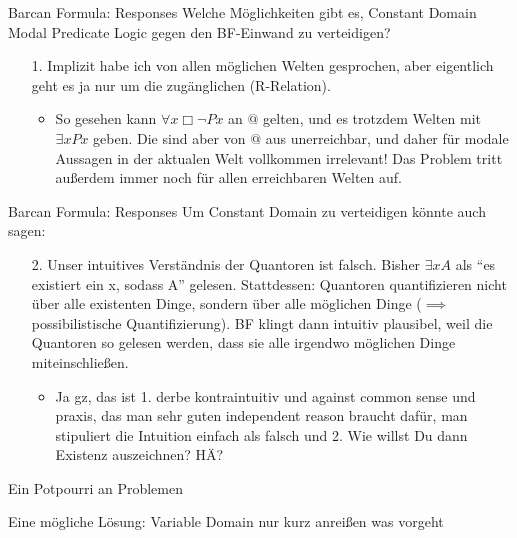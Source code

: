 \documentclass[12pt]{beamer}
\begin{document}
\begin{frame}{Barcan Formula: Responses}
  Welche Möglichkeiten gibt es, Constant Domain Modal Predicate Logic
  gegen den BF-Einwand zu verteidigen?
  \begin{enumerate}[<+->]
  \item[1.] Implizit habe ich von allen möglichen Welten gesprochen,
    aber eigentlich geht es ja nur um die zugänglichen (R-Relation).
    \begin{itemize}[<+->]
    \item So gesehen kann $\forall x \Box \neg Px$ an $@$ gelten, und
      es trotzdem Welten mit $\exists x Px$ geben. Die sind aber von
      $@$ aus unerreichbar, und daher für modale Aussagen in der
      aktualen Welt vollkommen irrelevant! Das Problem tritt außerdem
      immer noch für allen erreichbaren Welten auf.
    \end{itemize}
  \end{enumerate}
\end{frame}
\begin{frame}{Barcan Formula: Responses}
  Um Constant Domain zu verteidigen könnte auch sagen:
  \begin{enumerate}[<+->]
  \item[2.] Unser intuitives Verständnis der Quantoren ist
    falsch. Bisher $\exists x A$ als ``es existiert ein x, sodass A''
    gelesen. Stattdessen: Quantoren quantifizieren nicht über alle
    existenten Dinge, sondern über alle möglichen Dinge ($\implies$
    possibilistische Quantifizierung). BF klingt dann intuitiv plausibel, weil die Quantoren so gelesen werden, dass sie alle irgendwo möglichen Dinge miteinschließen.
    \begin{itemize}[<+->]
    \item Ja gz, das ist 1. derbe kontraintuitiv und against common sense und praxis, das man sehr guten independent reason braucht dafür, man stipuliert die Intuition einfach als falsch und 2. Wie willst Du dann Existenz auszeichnen? HÄ?
    \end{itemize}
  \end{enumerate}
\end{frame}

\begin{frame}
  \Huge Ein Potpourri an Problemen
\end{frame}

\begin{frame}{Eine mögliche Lösung: Variable Domain}
  nur kurz anreißen was vorgeht
\end{frame}
\end{document}
